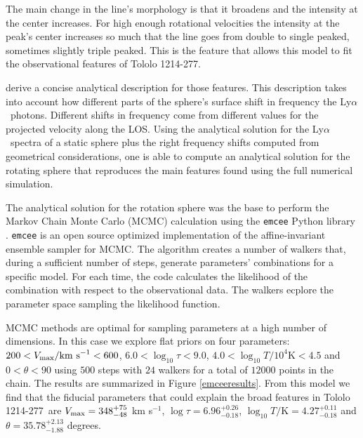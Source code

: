 \documentclass[a4paper, usenatbib, 12pt]{article}
\newcommand{\tol}{Tololo 1214-277}
\newcommand{\lya}{Ly$\alpha$}
\begin{document}
{The main change in the line's morphology is that it broadens and the
intensity at the center increases. 
For high enough rotational velocities the intensity at the peak's
center increases so much that the line goes from double to single
peaked, sometimes slightly triple peaked.
This is the feature that allows this model to fit the observational
features of \tol.

\cite{GaravitoCamargo2014} derive a concise analytical description for
those features. 
This description takes into account how different parts of the
sphere's surface shift in frequency the \lya\ photons. 
Different shifts in frequency come from different values for the projected
velocity along the LOS. 
Using the analytical solution for the \lya\ spectra of a static sphere
plus the right frequency shifts  computed from geometrical
considerations, one is able to compute an analytical solution for the
rotating sphere that reproduces the main features found using the full
numerical simulation. 

The analytical solution for the rotation sphere was the base to
perform the Markov Chain Monte Carlo (MCMC) calculation using the
\texttt{emcee} Python library \cite{2013PASP..125..306F}. \texttt{emcee} 
is an open source optimized implementation of the affine-invariant 
ensemble sampler for MCMC. The algorithm creates a number of walkers that,
during a sufficient number of steps, generate parameters' combinations for
a specific model. For each time, the code calculates the likelihood of the
combination with respect to the observational data. The walkers ecplore
the parameter space sampling the likelihood function.

MCMC methods are optimal for sampling parameters at a high number of 
dimensions. In this case we explore flat priors on four parameters:
$200<V_{\rm max}/\mathrm{km\ s}^{-1} <600$,  
$6.0<\log_{10}\tau<9.0$, $4.0<\log_{10} T/10^4\mathrm{K}< 4.5$ and
$0<\theta<90$ using $500$ steps with $24$ walkers for a total of
$12000$ points in the chain. 
The results are summarized in 
Figure \ref{emceeresults}. 
From this model we find that the fiducial 
parameters that could explain the broad features in \tol\ are 
$V_{\rm max}=348^{+75}_{-48}$ km s$^{-1}$, $\log \tau = 6.96^{+0.26}_{-0.18}$, 
$\log_{10} T/\mathrm {K} = 4.27^{+0.11}_{-0.18}$ and $\theta = 35.78^{+2.13}_{-1.88}$ 
degrees.


}
\end{document}
